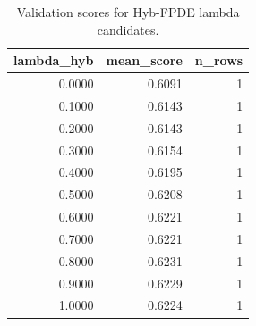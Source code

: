 \begin{table}[t]
\caption{Validation scores for Hyb-FPDE lambda candidates.}
\label{tab:lambda_distribution_computed}
\centering
\begin{tabular}{rrr}
\toprule
lambda\_hyb & mean\_score & n\_rows \\
\midrule
0.0000 & 0.6091 & 1 \\
0.1000 & 0.6143 & 1 \\
0.2000 & 0.6143 & 1 \\
0.3000 & 0.6154 & 1 \\
0.4000 & 0.6195 & 1 \\
0.5000 & 0.6208 & 1 \\
0.6000 & 0.6221 & 1 \\
0.7000 & 0.6221 & 1 \\
0.8000 & 0.6231 & 1 \\
0.9000 & 0.6229 & 1 \\
1.0000 & 0.6224 & 1 \\
\bottomrule
\end{tabular}

\end{table}
